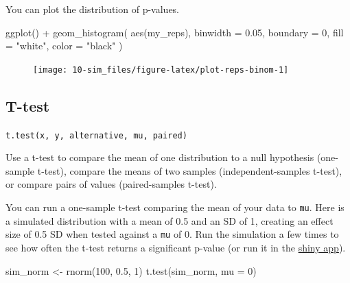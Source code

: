 \documentclass[
  oneside]{book}
\newenvironment{Shaded}{\begin{snugshade}}{\end{snugshade}}
\newcommand{\AttributeTok}[1]{\textcolor[rgb]{0.77,0.63,0.00}{#1}}
\newcommand{\DecValTok}[1]{\textcolor[rgb]{0.00,0.00,0.81}{#1}}
\newcommand{\FloatTok}[1]{\textcolor[rgb]{0.00,0.00,0.81}{#1}}
\newcommand{\FunctionTok}[1]{\textcolor[rgb]{0.00,0.00,0.00}{#1}}
\newcommand{\NormalTok}[1]{#1}
\newcommand{\OtherTok}[1]{\textcolor[rgb]{0.56,0.35,0.01}{#1}}
\newcommand{\SpecialCharTok}[1]{\textcolor[rgb]{0.00,0.00,0.00}{#1}}
\newcommand{\StringTok}[1]{\textcolor[rgb]{0.31,0.60,0.02}{#1}}
\begin{document}
You can plot the distribution of p-values.

\begin{Shaded}
\begin{Highlighting}[]
\FunctionTok{ggplot}\NormalTok{() }\SpecialCharTok{+} 
  \FunctionTok{geom\_histogram}\NormalTok{(}
    \FunctionTok{aes}\NormalTok{(my\_reps), }
    \AttributeTok{binwidth =} \FloatTok{0.05}\NormalTok{, }
    \AttributeTok{boundary =} \DecValTok{0}\NormalTok{,}
    \AttributeTok{fill =} \StringTok{"white"}\NormalTok{, }
    \AttributeTok{color =} \StringTok{"black"}
\NormalTok{  )}
\end{Highlighting}
\end{Shaded}

\begin{figure}

{\centering \texttt{[image: 10-sim\_files/figure-latex/plot-reps-binom-1]} 

}

\end{figure}

\hypertarget{t-test}{%
\subsection{T-test}\label{t-test}}

\texttt{t.test(x,\ y,\ alternative,\ mu,\ paired)}

Use a t-test to compare the mean of one distribution to a null hypothesis (one-sample t-test), compare the means of two samples (independent-samples t-test), or compare pairs of values (paired-samples t-test).

You can run a one-sample t-test comparing the mean of your data to \texttt{mu}. Here is a simulated distribution with a mean of 0.5 and an SD of 1, creating an effect size of 0.5 SD when tested against a \texttt{mu} of 0. Run the simulation a few times to see how often the t-test returns a significant p-value (or run it in the \href{http://shiny.psy.gla.ac.uk/debruine/normsim/}{shiny app}).

\begin{Shaded}
\begin{Highlighting}[]
\NormalTok{sim\_norm }\OtherTok{\textless{}{-}} \FunctionTok{rnorm}\NormalTok{(}\DecValTok{100}\NormalTok{, }\FloatTok{0.5}\NormalTok{, }\DecValTok{1}\NormalTok{)}
\FunctionTok{t.test}\NormalTok{(sim\_norm, }\AttributeTok{mu =} \DecValTok{0}\NormalTok{)}
\end{Highlighting}
\end{Shaded}
\end{document}
